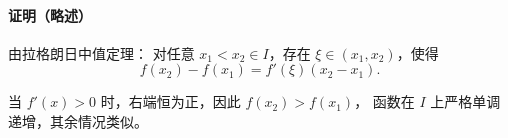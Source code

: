 \paragraph{证明（略述）}

由拉格朗日中值定理：  
对任意 $x_1 < x_2 \in I$，存在 $\xi \in (x_1,x_2)$，使得
\[
f(x_2)-f(x_1)=f'(\xi)(x_2-x_1).
\]

当 $f'(x)>0$ 时，右端恒为正，因此 $f(x_2)>f(x_1)$，
函数在 $I$ 上严格单调递增，其余情况类似。
